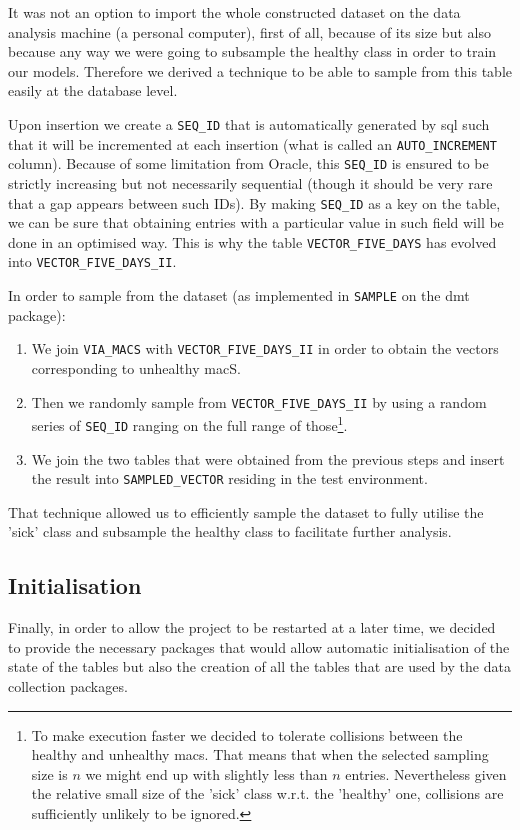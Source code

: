 It was not an option to import the whole constructed dataset on the data analysis machine (a personal computer), first of all, because of its size but also because any way we were going to subsample the healthy class in order to train our models. Therefore we derived a technique to be able to sample from this table easily at the database level. 

Upon insertion we create a \texttt{SEQ\_ID} that is automatically generated by \acrshort{sql} such that it will be incremented at each insertion (what is called an \texttt{AUTO\_INCREMENT} column). Because of some limitation from Oracle, this \texttt{SEQ\_ID} is ensured to be strictly increasing but not necessarily sequential (though it should be very rare that a gap appears between such IDs). By making \texttt{SEQ\_ID} as a key on the table, we can be sure that obtaining entries with a particular value in such field will be done in an optimised way. This is why the table \texttt{VECTOR\_FIVE\_DAYS} has evolved into \texttt{VECTOR\_FIVE\_DAYS\_II}.

In order to sample from the dataset (as implemented in \texttt{SAMPLE} on the \acrshort{dmt} package):
\begin{enumerate}
	\item We join \texttt{VIA\_MACS} with \texttt{VECTOR\_FIVE\_DAYS\_II} in order to obtain the vectors corresponding to unhealthy \acrshort{mac}S.
	\item Then we randomly sample from \texttt{VECTOR\_FIVE\_DAYS\_II} by using a random series of \texttt{SEQ\_ID} ranging on the full range of those\footnote{To make execution faster we decided to tolerate collisions between the healthy and unhealthy \acrshort{mac}s. That means that when the selected sampling size is $n$ we might end up with slightly less than $n$ entries. Nevertheless given the relative small size of the 'sick' class w.r.t. the 'healthy' one, collisions are sufficiently unlikely to be ignored.}. 
	\item We join the two tables that were obtained from the previous steps and insert the result into \texttt{SAMPLED\_VECTOR} residing in the test environment. 
\end{enumerate}

That technique allowed us to efficiently sample the dataset to fully utilise the 'sick' class and subsample the healthy class to facilitate further analysis.

\subsection{Initialisation}
Finally, in order to allow the project to be restarted at a later time, we decided to provide the necessary packages that would allow automatic initialisation of the state of the tables but also the creation of all the tables that are used by the data collection packages. 

